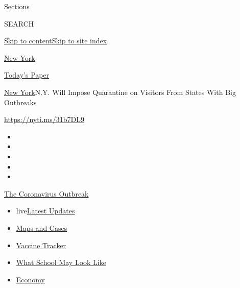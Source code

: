 Sections

SEARCH

\protect\hyperlink{site-content}{Skip to
content}\protect\hyperlink{site-index}{Skip to site index}

\href{https://www.nytimes.com/section/nyregion}{New York}

\href{https://myaccount.nytimes.com/auth/login?response_type=cookie\&client_id=vi}{}

\href{https://www.nytimes.com/section/todayspaper}{Today's Paper}

\href{/section/nyregion}{New York}\textbar{}N.Y. Will Impose Quarantine
on Visitors From States With Big Outbreaks

\url{https://nyti.ms/31b7DL9}

\begin{itemize}
\item
\item
\item
\item
\item
\end{itemize}

\href{https://www.nytimes.com/news-event/coronavirus?action=click\&pgtype=Article\&state=default\&region=TOP_BANNER\&context=storylines_menu}{The
Coronavirus Outbreak}

\begin{itemize}
\tightlist
\item
  live\href{https://www.nytimes.com/2020/08/01/world/coronavirus-covid-19.html?action=click\&pgtype=Article\&state=default\&region=TOP_BANNER\&context=storylines_menu}{Latest
  Updates}
\item
  \href{https://www.nytimes.com/interactive/2020/us/coronavirus-us-cases.html?action=click\&pgtype=Article\&state=default\&region=TOP_BANNER\&context=storylines_menu}{Maps
  and Cases}
\item
  \href{https://www.nytimes.com/interactive/2020/science/coronavirus-vaccine-tracker.html?action=click\&pgtype=Article\&state=default\&region=TOP_BANNER\&context=storylines_menu}{Vaccine
  Tracker}
\item
  \href{https://www.nytimes.com/interactive/2020/07/29/us/schools-reopening-coronavirus.html?action=click\&pgtype=Article\&state=default\&region=TOP_BANNER\&context=storylines_menu}{What
  School May Look Like}
\item
  \href{https://www.nytimes.com/live/2020/07/31/business/stock-market-today-coronavirus?action=click\&pgtype=Article\&state=default\&region=TOP_BANNER\&context=storylines_menu}{Economy}
\end{itemize}

